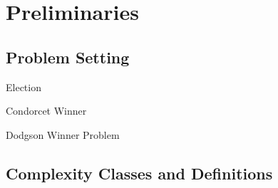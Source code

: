 \section{Preliminaries}

\subsection{Problem Setting}

\begin{defn}{Election}

\end{defn}

\begin{defn}{Condorcet Winner}

\end{defn}

\begin{defn}{Dodgson Winner Problem}
\end{defn}

\subsection{Complexity Classes and Definitions}